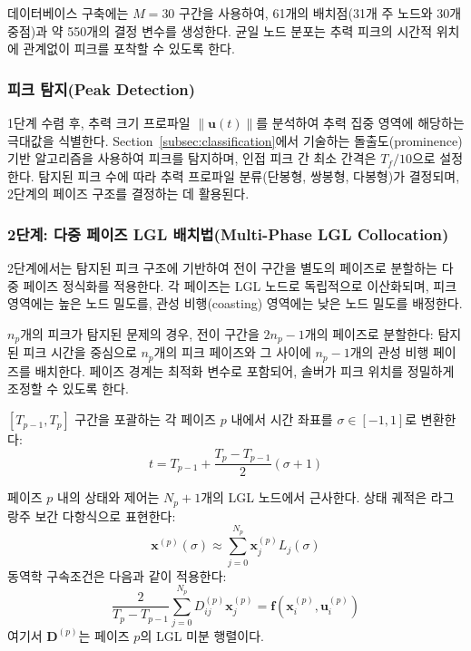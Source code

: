 \documentclass[a4paper,fleqn]{cas-dc}
\begin{document}
데이터베이스 구축에는 $M = 30$ 구간을 사용하여, 61개의 배치점(31개 주 노드와 30개 중점)과 약 550개의 결정 변수를 생성한다. 균일 노드 분포는 추력 피크의 시간적 위치에 관계없이 피크를 포착할 수 있도록 한다.

\subsubsection{피크 탐지(Peak Detection)}

1단계 수렴 후, 추력 크기 프로파일 $\|\mathbf{u}(t)\|$를 분석하여 추력 집중 영역에 해당하는 극대값을 식별한다. Section~\ref{subsec:classification}에서 기술하는 돌출도(prominence) 기반 알고리즘을 사용하여 피크를 탐지하며, 인접 피크 간 최소 간격은 $T_f/10$으로 설정한다. 탐지된 피크 수에 따라 추력 프로파일 분류(단봉형, 쌍봉형, 다봉형)가 결정되며, 2단계의 페이즈 구조를 결정하는 데 활용된다.

\subsubsection{2단계: 다중 페이즈 LGL 배치법(Multi-Phase LGL Collocation)}

2단계에서는 탐지된 피크 구조에 기반하여 전이 구간을 별도의 페이즈로 분할하는 다중 페이즈 정식화를 적용한다. 각 페이즈는 LGL 노드로 독립적으로 이산화되며, 피크 영역에는 높은 노드 밀도를, 관성 비행(coasting) 영역에는 낮은 노드 밀도를 배정한다.

$n_p$개의 피크가 탐지된 문제의 경우, 전이 구간을 $2n_p - 1$개의 페이즈로 분할한다: 탐지된 피크 시간을 중심으로 $n_p$개의 피크 페이즈와 그 사이에 $n_p - 1$개의 관성 비행 페이즈를 배치한다. 페이즈 경계는 최적화 변수로 포함되어, 솔버가 피크 위치를 정밀하게 조정할 수 있도록 한다.

$[T_{p-1}, T_p]$ 구간을 포괄하는 각 페이즈 $p$ 내에서 시간 좌표를 $\sigma \in [-1, 1]$로 변환한다:
\begin{equation}
t = T_{p-1} + \frac{T_p - T_{p-1}}{2}(\sigma + 1)
\end{equation}

페이즈 $p$ 내의 상태와 제어는 $N_p + 1$개의 LGL 노드에서 근사한다. 상태 궤적은 라그랑주 보간 다항식으로 표현한다:
\begin{equation}
\mathbf{x}^{(p)}(\sigma) \approx \sum_{j=0}^{N_p} \mathbf{x}_j^{(p)} L_j(\sigma)
\end{equation}
동역학 구속조건은 다음과 같이 적용한다:
\begin{equation}
\frac{2}{T_p - T_{p-1}} \sum_{j=0}^{N_p} D_{ij}^{(p)} \mathbf{x}_j^{(p)} = \mathbf{f}(\mathbf{x}_i^{(p)}, \mathbf{u}_i^{(p)})
\end{equation}
여기서 $\mathbf{D}^{(p)}$는 페이즈 $p$의 LGL 미분 행렬이다.
\end{document}
